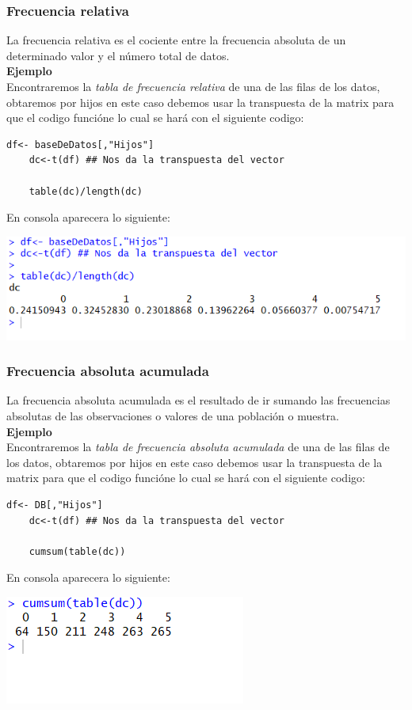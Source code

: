 \documentclass[12pt,hidelinks]{article}
\begin{document}
	\subsubsection{Frecuencia relativa}
	La frecuencia relativa es el cociente entre la frecuencia absoluta de un determinado valor y el número total de datos.\\
	\textbf{Ejemplo}\\
	\vspace{2mm}
	Encontraremos la \textit{tabla de frecuencia relativa} de una de las filas de los datos, obtaremos por hijos  en este caso debemos usar la transpuesta de la matrix para que el codigo funcióne lo cual se hará con el siguiente codigo:
	\begin{lstlisting}[frame=single]
	df<- baseDeDatos[,"Hijos"]
	dc<-t(df) ## Nos da la transpuesta del vector
	
	table(dc)/length(dc)
	\end{lstlisting}
	En consola aparecera lo siguiente:
	\begin{center}
		\includegraphics[width=\linewidth]{TFrelativa.PNG}
	\end{center}
	\subsubsection{Frecuencia absoluta acumulada}
	La frecuencia absoluta acumulada es el resultado de ir sumando las frecuencias absolutas de las observaciones o valores de una población o muestra.\\
	\textbf{Ejemplo}\\
	\vspace{2mm}
	Encontraremos la \textit{tabla de frecuencia absoluta acumulada} de una de las filas de los datos, obtaremos por hijos  en este caso debemos usar la transpuesta de la matrix para que el codigo funcióne lo cual se hará con el siguiente codigo:
	\begin{lstlisting}[frame=single]
	df<- DB[,"Hijos"]
	dc<-t(df) ## Nos da la transpuesta del vector
	
	cumsum(table(dc))
	\end{lstlisting}
	En consola aparecera lo siguiente:
	\begin{center}
		\includegraphics[]{TFabsolutaAcum.PNG}
	\end{center}
	
\end{document}
